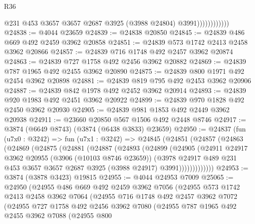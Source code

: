 \begin{lexlean}{R36}
\begin{coremodule}
                            @231
                            @453
                            @3657
                            @3657
                            @2687
                            @3925
                            (@3988 @24804)
                            @3991))))))))))))
@24838 := @4044 @23659
@24839 := @24838 @20850
@24845 := @24839 @486 @669 @492 @2459 @3962 @20858
@24851 := @24839 @573 @1742 @2413 @2458 @3962 @20866
@24857 := @24839 @716 @1748 @492 @2457 @3962 @20874
@24863 := @24839 @727 @1758 @492 @2456 @3962 @20882
@24869 := @24839 @787 @1965 @492 @2455 @3962 @20890
@24875 := @24839 @800 @1971 @492 @2454 @3962 @20898
@24881 := @24839 @819 @795 @492 @2453 @3962 @20906
@24887 := @24839 @842 @1978 @492 @2452 @3962 @20914
@24893 := @24839 @920 @1983 @492 @2451 @3962 @20922
@24899 := @24839 @970 @1828 @492 @2450 @3962 @20930
@24905 := @24839 @981 @1853 @492 @2449 @3962 @20938
@24911 := @23660 @20850 @567 @1506 @492 @2448 @8746
@24917 := @3874 (@6649 @8743) (@3874 (@6438 @3833) @23659)
@24950 := @24837
    (fun (u7x0 : @3242) =>
    fun (u7x1 : @3242) =>
    @24845
      (@24851
        (@24857
          (@24863
            (@24869
              (@24875
                (@24881
                  (@24887
                    (@24893
                      (@24899
                        (@24905
                          (@24911
                            @24917
                            @3962
                            @20955
                            (@3906 (@10103 @8746 @23659))
                            (@3978
                              @24917
                              @489
                              @231
                              @453
                              @3657
                              @3657
                              @2687
                              @3925
                              (@3988 @24917)
                              @3991)))))))))))))
@24953 := @3874 (@3878 @3423) @19815
@24955 := @4044 @24953 @7009
@25065 := @24950
    (@24955
      @486
      @669
      @492
      @2459
      @3962
      @7056
      (@24955
        @573
        @1742
        @2413
        @2458
        @3962
        @7064
        (@24955
          @716
          @1748
          @492
          @2457
          @3962
          @7072
          (@24955
            @727
            @1758
            @492
            @2456
            @3962
            @7080
            (@24955
              @787
              @1965
              @492
              @2455
              @3962
              @7088
              (@24955
                @800

\end{coremodule}
\end{lexlean}
